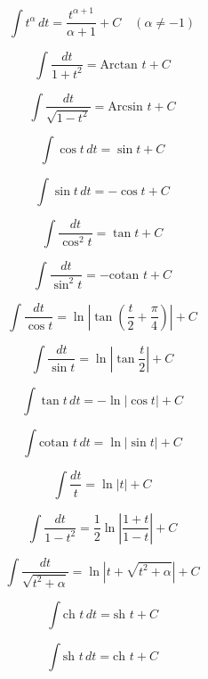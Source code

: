 \documentclass[class=report,crop=false]{standalone}
\begin{document}
\begin{multicols}{2}[
]

$$\int t^{\alpha} \, dt= \frac{t^{\alpha +1}}{\alpha+1}+C \quad (\alpha \not= -1)$$

\vspace{2mm}

$$\int \frac{dt}{1+t^2} = \text{Arctan }t+C$$

\vspace{6mm}

$$\int \frac{dt}{\sqrt{1-t^2}} = \text{Arcsin }t+C$$

\vspace{4mm}


$$\int \cos t \, dt = \sin t +C$$

$$\int \sin t \, dt = -\cos t +C$$

$$\int \frac{dt}{\cos^2 t} = \tan t +C$$

$$\int \frac{dt}{\sin^2 t} = -\text{cotan } t +C$$

$$\int \frac{dt}{\cos t} = \ln \left| \tan \left( \frac{t}{2}+\frac{\pi}{4} \right) \right| +C$$

$$\int \frac{dt}{\sin t} = \ln \left| \tan \frac{t}{2} \right| +C$$

$$\int \tan t \, dt = - \ln \left| \cos t \right| +C$$

\vspace{-2mm}

$$\int \text{cotan } t \, dt = \ln \left| \sin t \right| +C$$


$$\int \frac{dt}{t} = \ln|t|+C$$

$$\int \frac{dt}{1-t^2} = \frac{1}{2}\ln \left| \frac{1+t}{1-t} \right| +C$$

$$\int \frac{dt}{\sqrt{t^2+\alpha}} = \ln \left| t+\sqrt{t^2+\alpha} \right| +C$$

$$\int \text{ch } t \, dt = \text{sh } t +C$$

$$\int \text{sh } t \, dt = \text{ch } t +C$$


\end{multicols}
\end{document}

